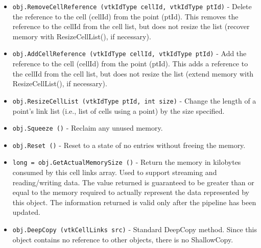 \begin{itemize}
\item  \verb|obj.RemoveCellReference (vtkIdType cellId, vtkIdType ptId)| -  Delete the reference to the cell (cellId) from the point (ptId). This
 removes the reference to the cellId from the cell list, but does not
 resize the list (recover memory with ResizeCellList(), if necessary).

\item  \verb|obj.AddCellReference (vtkIdType cellId, vtkIdType ptId)| -  Add the reference to the cell (cellId) from the point (ptId). This
 adds a reference to the cellId from the cell list, but does not resize
 the list (extend memory with ResizeCellList(), if necessary).

\item  \verb|obj.ResizeCellList (vtkIdType ptId, int size)| -  Change the length of a point's link list (i.e., list of cells using a
 point) by the size specified.

\item  \verb|obj.Squeeze ()| -  Reclaim any unused memory.

\item  \verb|obj.Reset ()| -  Reset to a state of no entries without freeing the memory.

\item  \verb|long = obj.GetActualMemorySize ()| -  Return the memory in kilobytes consumed by this cell links array. 
 Used to support streaming and reading/writing data. The value 
 returned is guaranteed to be greater than or equal to the memory 
 required to actually represent the data represented by this object. 
 The information returned is valid only after the pipeline has 
 been updated.

\item  \verb|obj.DeepCopy (vtkCellLinks src)| -  Standard DeepCopy method.  Since this object contains no reference
 to other objects, there is no ShallowCopy.

\end{itemize}
